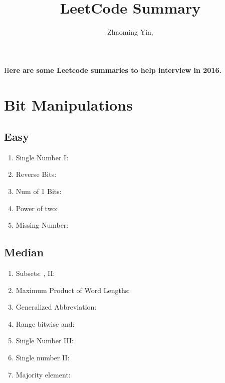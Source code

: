 \documentclass[DIV=calc, paper=a4, fontsize=11pt, twocolumn]{scrartcl}	 %
\title{LeetCode Summary} %
\author{Zhaoming Yin, } %
\date{} %
\newcommand{\initial}[1]{ %
\lettrine[lines=3,lhang=0.3,nindent=0em]{
\color{DarkGoldenrod}
{\textsf{#1}}}{}}
\begin{document}
\maketitle %

\thispagestyle{fancy} %


\initial{H}\textbf{ere are some Leetcode summaries to help interview in 2016. }


\section*{Bit Manipulations}

\subsection*{Easy}

\begin{enumerate}
\item Single Number I: \cite{136} 
\item Reverse Bits:    \cite{190}
\item Num of 1 Bits:   \cite{191} 
\item Power of two:    \cite{231} 
\item Missing Number:  \cite{268}  
\end{enumerate}

\subsection*{Median}

\begin{enumerate}
\item Subsets: \cite{078}, II: \cite{090}
\item Maximum Product of Word Lengths: \cite{318} 
\item Generalized Abbreviation: \cite{320}
\item Range bitwise and: \cite{201} 

\item Single Number III: \cite{260} 
\item Single number II: \cite{137}
\item Majority element: \cite{169}
\end{enumerate}
\end{document}
